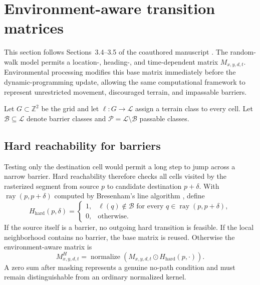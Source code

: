 \section{Environment-aware transition matrices}
\label{sec:environment-transitions}

This section follows Sections~3.4--3.5 of the coauthored manuscript \parencite{buchin2026advanced}. The random-walk model permits a location-, heading-, and time-dependent matrix $M_{x,y,d,t}$. Environmental processing modifies this base matrix immediately before the dynamic-programming update, allowing the same computational framework to represent unrestricted movement, discouraged terrain, and impassable barriers.

Let $G\subset\mathbb{Z}^2$ be the grid and let $\ell:G\rightarrow\mathcal{L}$ assign a terrain class to every cell. Let $\mathcal{B}\subseteq\mathcal{L}$ denote barrier classes and $\mathcal{P}=\mathcal{L}\setminus\mathcal{B}$ passable classes.

\subsection{Hard reachability for barriers}
\label{sec:hard-reachability}

Testing only the destination cell would permit a long step to jump across a narrow barrier. Hard reachability therefore checks all cells visited by the rasterized segment from source $p$ to candidate destination $p+\delta$. With $\operatorname{ray}(p,p+\delta)$ computed by Bresenham's line algorithm \parencite{bresenham1965line}, define
\begin{equation}
  H_{\mathrm{hard}}(p,\delta)=
  \begin{cases}
    1, & \ell(q)\notin\mathcal{B}\text{ for every }q\in\operatorname{ray}(p,p+\delta),\\
    0, & \text{otherwise.}
  \end{cases}
\end{equation}
If the source itself is a barrier, no outgoing hard transition is feasible. If the local neighborhood contains no barrier, the base matrix is reused. Otherwise the environment-aware matrix is
\begin{equation}
  M^H_{x,y,d,t}=\operatorname{normalize}\!\left(
    M_{x,y,d,t}\odot H_{\mathrm{hard}}(p,\cdot)
  \right).
\end{equation}
A zero sum after masking represents a genuine no-path condition and must remain distinguishable from an ordinary normalized kernel.

